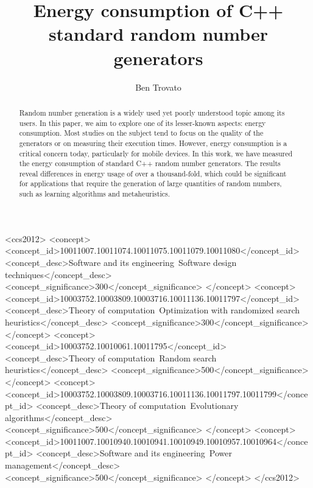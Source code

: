 \documentclass[sigconf]{acmart}
\begin{document}
\title{Energy consumption of C++ standard random number generators}
\subtitle{}

\renewcommand{\shorttitle}{Energy consumption of C++ standard random number generators}

\author{Ben Trovato}

\renewcommand{\shortauthors}{B. Trovato}

\begin{abstract}
Random number generation is a widely used yet poorly understood topic among its users. In this paper, we aim to explore one of its lesser-known aspects: energy consumption. Most studies on the subject tend to focus on the quality of the generators or on measuring their execution times. However, energy consumption is a critical concern today, particularly for mobile devices. In this work, we have measured the energy consumption of standard C++ random number generators. The results reveal differences in energy usage of over a thousand-fold, which could be significant for applications that require the generation of large quantities of random numbers, such as learning algorithms and metaheuristics.
\end{abstract}

%
%
\begin{CCSXML}
<ccs2012>
   <concept>
       <concept_id>10011007.10011074.10011075.10011079.10011080</concept_id>
       <concept_desc>Software and its engineering~Software design techniques</concept_desc>
       <concept_significance>300</concept_significance>
       </concept>
   <concept>
       <concept_id>10003752.10003809.10003716.10011136.10011797</concept_id>
       <concept_desc>Theory of computation~Optimization with randomized search heuristics</concept_desc>
       <concept_significance>300</concept_significance>
       </concept>
   <concept>
       <concept_id>10003752.10010061.10011795</concept_id>
       <concept_desc>Theory of computation~Random search heuristics</concept_desc>
       <concept_significance>500</concept_significance>
       </concept>
   <concept>
       <concept_id>10003752.10003809.10003716.10011136.10011797.10011799</concept_id>
       <concept_desc>Theory of computation~Evolutionary algorithms</concept_desc>
       <concept_significance>500</concept_significance>
       </concept>
   <concept>
       <concept_id>10011007.10010940.10010941.10010949.10010957.10010964</concept_id>
       <concept_desc>Software and its engineering~Power management</concept_desc>
       <concept_significance>500</concept_significance>
       </concept>
 </ccs2012>
\end{CCSXML}
\end{document}
